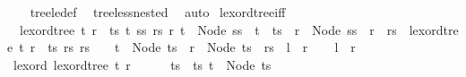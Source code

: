 \begin{isabellebody}
\ \ %
\endisadelimproof
%
\isatagproof
{}\isamarkupfalse%
\ tree{\isacharunderscore}{\kern0pt}le{\isacharunderscore}{\kern0pt}def\ \isamarkupfalse%
\ tree{\isacharunderscore}{\kern0pt}less{\isacharunderscore}{\kern0pt}nested\ \isamarkupfalse%
\ auto%
\endisatagproof
{\isafoldproof}%
%
\isadelimproof
\isanewline
%
\endisadelimproof
\isanewline
{}\isamarkupfalse%
\ lexord{\isacharunderscore}{\kern0pt}tree{\isacharunderscore}{\kern0pt}iff{\isacharcolon}{\kern0pt}\isanewline
\ \ {\isachardoublequoteopen}lexord{\isacharunderscore}{\kern0pt}tree\ t\ r\ {\isasymlongleftrightarrow}\ {\isacharparenleft}{\kern0pt}{\isasymexists}ts\ t{\isacharprime}{\kern0pt}\ ss\ rs\ r{\isacharprime}{\kern0pt}{\isachardot}{\kern0pt}\ t\ {\isacharequal}{\kern0pt}\ Node\ {\isacharparenleft}{\kern0pt}ss\ {\isacharat}{\kern0pt}\ t{\isacharprime}{\kern0pt}\ {\isacharhash}{\kern0pt}\ ts{\isacharparenright}{\kern0pt}\ {\isasymand}\ r\ {\isacharequal}{\kern0pt}\ Node\ {\isacharparenleft}{\kern0pt}ss\ {\isacharat}{\kern0pt}\ r{\isacharprime}{\kern0pt}\ {\isacharhash}{\kern0pt}\ rs{\isacharparenright}{\kern0pt}\ {\isasymand}\ lexord{\isacharunderscore}{\kern0pt}tree\ t{\isacharprime}{\kern0pt}\ r{\isacharprime}{\kern0pt}{\isacharparenright}{\kern0pt}\ {\isasymor}\ {\isacharparenleft}{\kern0pt}{\isasymexists}ts\ rs{\isachardot}{\kern0pt}\ rs\ {\isasymnoteq}\ {\isacharbrackleft}{\kern0pt}{\isacharbrackright}{\kern0pt}\ {\isasymand}\ t\ {\isacharequal}{\kern0pt}\ Node\ ts\ {\isasymand}\ r\ {\isacharequal}{\kern0pt}\ Node\ {\isacharparenleft}{\kern0pt}ts\ {\isacharat}{\kern0pt}\ rs{\isacharparenright}{\kern0pt}{\isacharparenright}{\kern0pt}{\isachardoublequoteclose}\ {\isacharparenleft}{\kern0pt}\ {\isachardoublequoteopen}{\isacharquery}{\kern0pt}l\ {\isasymlongleftrightarrow}\ {\isacharquery}{\kern0pt}r{\isachardoublequoteclose}{\isacharparenright}{\kern0pt}\isanewline
%
\isadelimproof
%
\endisadelimproof
%
\isatagproof
{}\isamarkupfalse%
\isanewline
\ \ \isamarkupfalse%
\ {\isachardoublequoteopen}{\isacharquery}{\kern0pt}l\ {\isasymLongrightarrow}\ {\isacharquery}{\kern0pt}r{\isachardoublequoteclose}\isanewline
\ \ \isamarkupfalse%
{\isacharminus}{\kern0pt}\isanewline
\ \ \ \ \isamarkupfalse%
\ lexord{\isacharcolon}{\kern0pt}\ {\isachardoublequoteopen}lexord{\isacharunderscore}{\kern0pt}tree\ t\ r{\isachardoublequoteclose}\isanewline
\ \ \ \ \isamarkupfalse%
\ ts\ \ ts{\isacharcolon}{\kern0pt}\ {\isachardoublequoteopen}t\ {\isacharequal}{\kern0pt}\ Node\ ts{\isachardoublequoteclose}\ \isamarkupfalse%

\end{isabellebody}
